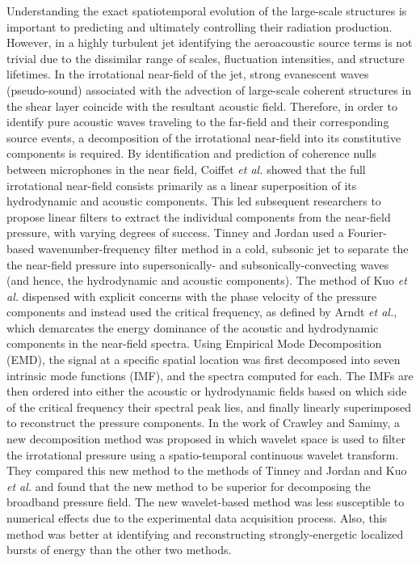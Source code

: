 \documentclass[english]{aiaa-tc}
\begin{document}
Understanding the exact spatiotemporal evolution of the large-scale structures is important to predicting and ultimately controlling their radiation production. However, in a highly turbulent jet identifying the aeroacoustic source terms is not trivial due to the dissimilar range of scales, fluctuation intensities, and structure lifetimes. In the irrotational near-field of the jet, strong evanescent waves (pseudo-sound) associated with the advection of large-scale coherent structures in the shear layer coincide with the resultant acoustic field. Therefore, in order to identify pure acoustic waves traveling to the far-field and their corresponding source events, a decomposition of the irrotational near-field into its constitutive components is required. By identification and prediction of coherence nulls between microphones in the near field, Coiffet {\em et al.}\cite{Coiffet2006} showed that the full irrotational near-field consists primarily as a linear superposition of its hydrodynamic and acoustic components. This led subsequent researchers to propose linear filters to extract the individual components from the near-field pressure, with varying degrees of success. 
 Tinney and Jordan\cite{Tinney2008} used a Fourier-based wavenumber-frequency filter method in a cold, subsonic jet to separate the the near-field pressure into supersonically- and subsonically-convecting waves (and hence, the hydrodynamic and acoustic components). The method of Kuo {\em et al.}\cite{Kuo2013} dispensed with explicit concerns with the phase velocity of the pressure components and instead used the critical frequency, as defined by Arndt {\em et al.}\cite{Arndt1997}, which demarcates the energy dominance of the acoustic and hydrodynamic components in the near-field spectra. Using Empirical Mode Decomposition (EMD), the signal at a specific spatial location was first decomposed into seven intrinsic mode functions (IMF), and the spectra computed for each. The IMFs are then ordered into either the acoustic or hydrodynamic fields based on which side of the critical frequency their spectral peak lies, and finally linearly superimposed to reconstruct the pressure components. In the work of Crawley and Samimy\cite{crawley2014b}, a new decomposition method was proposed in which wavelet space is used to filter the irrotational pressure using a spatio-temporal continuous wavelet transform. They compared this new method to the methods of Tinney and Jordan\cite{Tinney2008} and Kuo {\em et al.}\cite{Kuo2013} and found that the new method to be superior for decomposing the broadband pressure field. The new wavelet-based method was less susceptible to numerical effects due to the experimental data acquisition process. Also, this method was better at identifying and reconstructing strongly-energetic localized bursts of energy than the other two methods.
\end{document}
